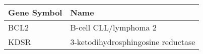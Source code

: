 \begin{tabular}{ll}
\toprule
Gene Symbol &                               Name \\
\midrule
       BCL2 &              B-cell CLL/lymphoma 2 \\
       KDSR & 3-ketodihydrosphingosine reductase \\
\bottomrule
\end{tabular}
